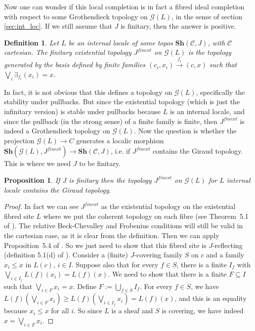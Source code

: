 \documentclass{article}
\newtheorem{definition}[theorem]{Definition}
\newtheorem{proposition}[theorem]{Proposition}
\begin{document}
Now one can wonder if this local completion is in fact a fibred ideal completion with respect to some Grothendieck topology on $\mathcal{G}(L)$, in the sense of section \ref{sec:int_loc}. If we still assume that $J$ is finitary, then the answer is positive. 

\begin{definition}
    Let $L$ be an internal locale of some topos $\mathbf{Sh}(\mathcal{C},J)$, with $\mathcal{C}$ cartesian. The finitary existential topology $J^{finext}$ on $\mathcal{G}(L)$ is the topology generated by the basis defined by finite families $(c_i,x_i)\xrightarrow{f_i}(c,x)$ such that $\bigvee_i \exists_{f_i}(x_i)=x$.
\end{definition}

In fact, it is not obvious that this defines a topology on $\mathcal{G}(L)$, specifically the stability under pullbacks. But since the existential topology (which is just the infinitary version) is stable under pullbacks because $L$ is an internal locale, and since the pullback (in the strong sense) of a finite family is finite, then $J^{finext}$ is indeed a Grothendieck topology on $\mathcal{G}(L)$. Now the question is whether the projection $\mathcal{G}(L)\xrightarrow{}C$ generates a localic morphism $\mathbf{Sh}(\mathcal{G}(L),J^{finext})\xrightarrow{}\mathbf{Sh}(\mathcal{C},J)$, i.e. if $J^{finext}$ contains the Giraud topology. This is where we need $J$ to be finitary.

\begin{proposition}
    If $J$ is finitary then the topology $J^{finext}$ on $\mathcal{G}(L)$ for $L$ internal locale contains the Giraud topology.
\end{proposition}
\begin{proof}
    In fact we can see $J^{finext}$ as the existential topology on the existential fibred site $L$ where we put the coherent topology on each fibre (see Theorem~5.1 of \cite{caramello2022fibred}). The relative Beck-Chevalley and Frobenius conditions will still be valid in the cartesian case, as it is clear from the definition. Then we can apply  Proposition~5.4 of \cite{caramello2022fibred}. So we just need to show that this fibred site is $J$-reflecting (definition 5.1(d) of \cite{caramello2022fibred}). Consider a (finite) $J$-covering family $S$ on $c$ and a family $x_i\leq x$ in $L(c)$, $i\in I$. Suppose also that for every $f\in S$, there is a finite $I_f$ with $\bigvee_{i\in I_f}L(f)(x_i)=L(f)(x)$. We need to show that there is a finite $F\subseteq I$ such that $\bigvee_{i\in F}x_i=x$. Define $F:=\bigcup_{f\in S}I_f$. For every $f\in S$, we have $L(f)(\bigvee_{i\in F}x_i)\geq L(f)(\bigvee_{i\in I_f}x_i)=L(f)(x)$, and this is an equality because $x_i\leq x$ for all $i$. So since $L$ is a sheaf and $S$ is covering, we have indeed $x=\bigvee_{i\in F}x_i$.
\end{proof}
\end{document}
